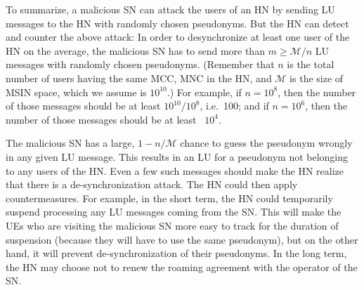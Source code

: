 \documentclass{llncs} %
\begin{document}
To summarize, a malicious SN can attack the users of an HN by sending LU messages to the HN with randomly chosen pseudonyms. But the HN can detect and counter the above attack: In order to desynchronize at least one user of the HN on the average, the malicious SN has to send more than $m \geq \mathcal{M}/n$  LU messages with randomly chosen pseudonyms. (Remember that $n$ is the total number of users having the same MCC, MNC in the HN, and $\mathcal{M}$ is the size of MSIN space, which we assume is $10^{10}$.) For example, if $n=10^8$, then the number of those messages should be at least $10^{10}/10^{8}$, i.e.~100; and if $n=10^6$, then the number of those messages should be at least ~$10^4.$
 
The malicious SN has a large, $1 - n/\mathcal{M}$ chance to guess the pseudonym wrongly in any given LU message. This results in an LU for a pseudonym not belonging to any users of the HN. Even a few such messages should make the HN realize that there is a de-synchronization attack. The HN could then apply countermeasures. For example, in the short term, the HN could temporarily suspend processing any LU messages coming from the SN. This will make the UEs who are visiting the malicious SN more easy to track for the duration of suspension (because they will have to use the same pseudonym), but on the other hand, it will prevent de-synchronization of their pseudonyms. In the long term, the HN may choose not to renew the roaming agreement with the operator of the SN.


\end{document}

